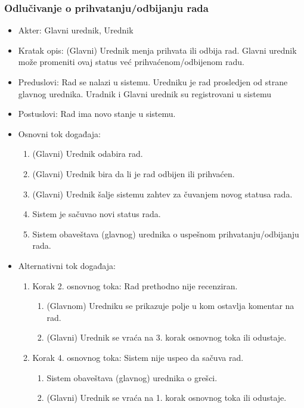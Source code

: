 \documentclass[a4paper]{article}
\begin{document}
\subsubsection{Odlučivanje o prihvatanju/odbijanju rada}
\begin{itemize}
    \item Akter: Glavni urednik, Urednik
    \item Kratak opis: (Glavni) Urednik menja prihvata ili odbija rad. Glavni urednik može promeniti ovaj status već prihvaćenom/odbijenom radu.
    \item Preduslovi: Rad se nalazi u sistemu. Uredniku je rad prosledjen od strane glavnog urednika. Uradnik i Glavni urednik su registrovani u sistemu
    \item Postuslovi: Rad ima novo stanje u sistemu.
    \item Osnovni tok događaja:
        \begin{enumerate}
            \item (Glavni) Urednik odabira rad.
            \item (Glavni) Urednik bira da li je rad odbijen ili prihvaćen.
            \item (Glavni) Urednik šalje sistemu zahtev za čuvanjem novog statusa rada.
            \item Sistem je sačuvao novi status rada.
            \item Sistem obaveštava (glavnog) urednika o uspešnom prihvatanju/odbijanju rada.
        \end{enumerate}
    \item Alternativni tok događaja:
        \begin{enumerate}
            \item Korak 2. osnovnog toka: Rad prethodno nije recenziran.
                \begin{enumerate}
                    \item (Glavnom) Uredniku se prikazuje polje u kom ostavlja komentar na rad.
                    \item (Glavni) Urednik se vraća na 3. korak osnovnog toka ili odustaje.
                \end{enumerate}
            \item Korak 4. osnovnog toka: Sistem nije uspeo da sačuva rad.
            \begin{enumerate}
                \item Sistem obaveštava (glavnog) urednika o grešci.
                \item (Glavni) Urednik se vraća na 1. korak osnovnog toka ili odustaje.
            \end{enumerate}
        \end{enumerate}
\end{itemize}
\end{document}
